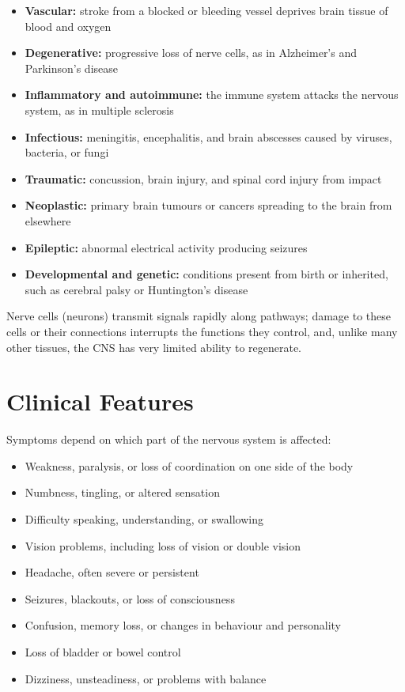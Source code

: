 \begin{itemize}
    \item \textbf{Vascular:} stroke from a blocked or bleeding vessel deprives brain tissue of blood and oxygen
    \item \textbf{Degenerative:} progressive loss of nerve cells, as in Alzheimer's and Parkinson's disease
    \item \textbf{Inflammatory and autoimmune:} the immune system attacks the nervous system, as in multiple sclerosis
    \item \textbf{Infectious:} meningitis, encephalitis, and brain abscesses caused by viruses, bacteria, or fungi
    \item \textbf{Traumatic:} concussion, brain injury, and spinal cord injury from impact
    \item \textbf{Neoplastic:} primary brain tumours or cancers spreading to the brain from elsewhere
    \item \textbf{Epileptic:} abnormal electrical activity producing seizures
    \item \textbf{Developmental and genetic:} conditions present from birth or inherited, such as cerebral palsy or Huntington's disease
\end{itemize}

Nerve cells (neurons) transmit signals rapidly along pathways; damage to these cells or their connections interrupts the functions they control, and, unlike many other tissues, the CNS has very limited ability to regenerate.

\section*{Clinical Features}
Symptoms depend on which part of the nervous system is affected:

\begin{itemize}
    \item Weakness, paralysis, or loss of coordination on one side of the body
    \item Numbness, tingling, or altered sensation
    \item Difficulty speaking, understanding, or swallowing
    \item Vision problems, including loss of vision or double vision
    \item Headache, often severe or persistent
    \item Seizures, blackouts, or loss of consciousness
    \item Confusion, memory loss, or changes in behaviour and personality
    \item Loss of bladder or bowel control
    \item Dizziness, unsteadiness, or problems with balance
\end{itemize}

